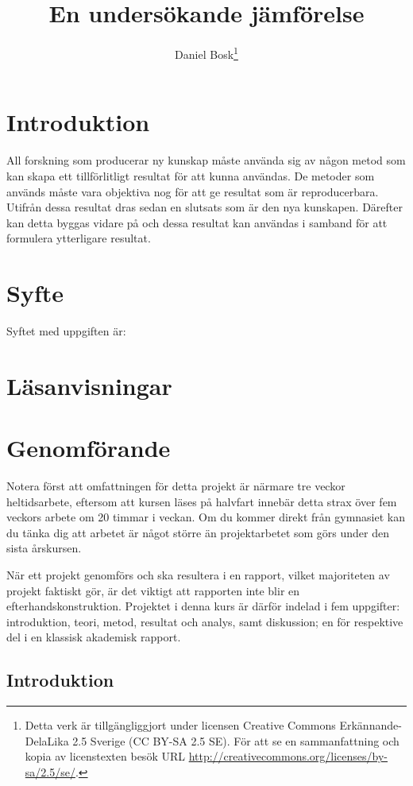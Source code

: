 \documentclass[a4paper]{miunasgn}
\title{En undersökande jämförelse}
\author{Daniel Bosk\thanks{%
	Detta verk är tillgängliggjort under licensen Creative Commons 
	Erkännande-DelaLika 2.5 Sverige (CC BY-SA 2.5 SE).
	För att se en sammanfattning och kopia av licenstexten besök URL 
	\url{http://creativecommons.org/licenses/by-sa/2.5/se/}.
	}
}
\date{\svnId}
\begin{document}
\maketitle
\thispagestyle{foot}
\tableofcontents


\section{Introduktion}
\noindent
All forskning som producerar ny kunskap måste använda sig av någon metod som 
kan skapa ett tillförlitligt resultat för att kunna användas.
De metoder som används måste vara objektiva nog för att ge resultat som är 
reproducerbara.
Utifrån dessa resultat dras sedan en slutsats som är den nya kunskapen.
Därefter kan detta byggas vidare på och dessa resultat kan användas i samband 
för att formulera ytterligare resultat.


\section{Syfte}
\noindent
Syftet med uppgiften är:
\begin{itemize}
  
\end{itemize}


\section{Läsanvisningar}
\noindent



\section{Genomförande}

Notera först att omfattningen för detta projekt är närmare tre veckor 
heltidsarbete, eftersom att kursen läses på halvfart innebär detta strax över 
fem veckors arbete om 20 timmar i veckan.
Om du kommer direkt från gymnasiet kan du tänka dig att arbetet är något större 
än projektarbetet som görs under den sista årskursen.

När ett projekt genomförs och ska resultera i en rapport, vilket majoriteten av 
projekt faktiskt gör, är det viktigt att rapporten inte blir en 
efterhandskonstruktion.
Projektet i denna kurs är därför indelad i fem uppgifter: introduktion, teori, 
metod, resultat och analys, samt diskussion; en för respektive del i en 
klassisk akademisk rapport.

\subsection{Introduktion}
\end{document}
